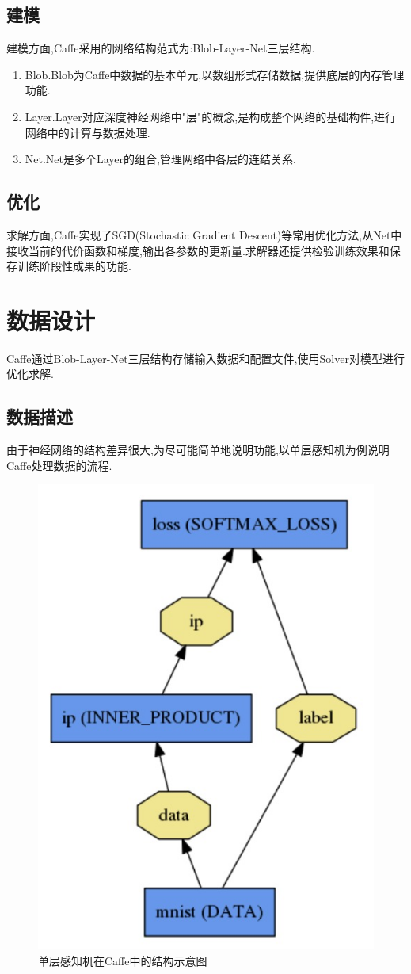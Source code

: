 \documentclass[a4paper]{article}
\begin{document}
	\subsection{建模}
	建模方面,Caffe采用的网络结构范式为:Blob-Layer-Net三层结构.
	\begin{enumerate}
		\item Blob.Blob为Caffe中数据的基本单元,以数组形式存储数据,提供底层的内存管理功能.
		\item Layer.Layer对应深度神经网络中"层"的概念,是构成整个网络的基础构件,进行网络中的计算与数据处理.
		\item Net.Net是多个Layer的组合,管理网络中各层的连结关系.
	\end{enumerate}
	\subsection{优化}
	求解方面,Caffe实现了SGD(Stochastic Gradient Descent)等常用优化方法,从Net中接收当前的代价函数和梯度,输出各参数的更新量.求解器还提供检验训练效果和保存训练阶段性成果的功能.
	
	\section{数据设计}
	Caffe通过Blob-Layer-Net三层结构存储输入数据和配置文件,使用Solver对模型进行优化求解.
	\subsection{数据描述}
	由于神经网络的结构差异很大,为尽可能简单地说明功能,以单层感知机为例说明Caffe处理数据的流程.
	\begin{figure}[H]
		\centering
		\includegraphics[width=0.3\linewidth]{logreg.jpg}
		\caption{单层感知机在Caffe中的结构示意图\cite{caffebln}}
		\label{logreg}
	\end{figure}
\end{document}
